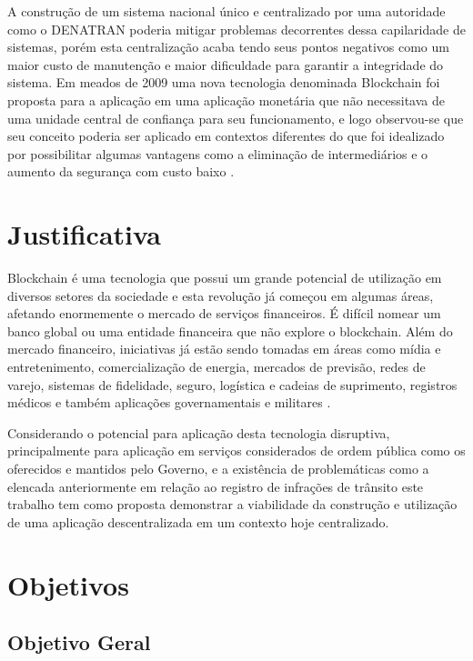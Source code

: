 A construção de um sistema nacional único e centralizado por uma autoridade como o DENATRAN poderia mitigar problemas decorrentes dessa capilaridade de sistemas, porém esta centralização acaba tendo seus pontos negativos como um maior custo de manutenção e maior dificuldade para garantir a integridade do sistema. Em meados de 2009 uma nova tecnologia denominada Blockchain foi proposta para a aplicação em uma aplicação monetária que não necessitava de uma unidade central de confiança para seu funcionamento, e logo observou-se que seu conceito poderia ser aplicado em contextos diferentes do que foi idealizado por possibilitar algumas vantagens como a eliminação de intermediários e o aumento da segurança com custo baixo \cite{beginnig_blockchain_bikramaditya}.


\section{Justificativa}

Blockchain é uma tecnologia que possui um grande potencial de utilização em diversos setores da sociedade e esta revolução já começou em algumas áreas, afetando enormemente o mercado de serviços financeiros. É difícil nomear um banco global ou uma entidade financeira que não explore o blockchain. Além do mercado financeiro, iniciativas já estão sendo tomadas em áreas como mídia e entretenimento, comercialização de energia, mercados de previsão, redes de varejo, sistemas de fidelidade, seguro, logística e cadeias de suprimento, registros médicos e também aplicações governamentais e militares \cite{beginnig_blockchain_bikramaditya}.

Considerando o potencial para aplicação desta tecnologia disruptiva, principalmente para aplicação em serviços considerados de ordem pública como os oferecidos e mantidos pelo Governo, e a existência de problemáticas como a elencada anteriormente em relação ao registro de infrações de trânsito este trabalho tem como proposta demonstrar a viabilidade da construção e utilização de uma aplicação descentralizada em um contexto hoje centralizado.

\section{Objetivos}

    \subsection{Objetivo Geral}
    
